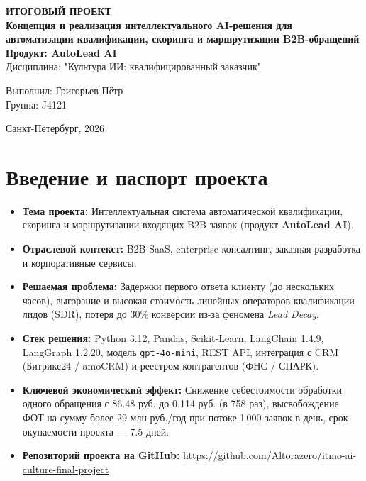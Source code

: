 \documentclass[12pt,a4paper]{article}
\begin{document}
	
	\begin{titlepage}
		\begin{center}
			\vspace*{3.5cm}
			\Huge \textbf{ИТОГОВЫЙ ПРОЕКТ} \\
			\vspace{0.4cm}
			\LARGE \textbf{Концепция и реализация интеллектуального AI-решения для автоматизации квалификации, скоринга и маршрутизации B2B-обращений} \\
			\vspace{0.3cm}
			\Large \textbf{Продукт: \guillemotleft AutoLead AI\guillemotright} \\
			\vspace{1cm}
			\Large Дисциплина: "Культура ИИ: квалифицированный заказчик" \\
			\vspace{2.5cm}
			\large
			\begin{flushright}
				Выполнил: Григорьев Пётр \\
				Группа: J4121 \\
			\end{flushright}
			\vfill
			Санкт-Петербург, 2026
		\end{center}
	\end{titlepage}

	\section*{Введение и паспорт проекта}
	
	\begin{itemize}[noitemsep,topsep=2pt]
		\item \textbf{Тема проекта:} Интеллектуальная система автоматической квалификации, скоринга и маршрутизации входящих B2B-заявок (продукт \textbf{\guillemotleft AutoLead AI\guillemotright}).
		\item \textbf{Отраслевой контекст:} B2B SaaS, enterprise-консалтинг, заказная разработка и корпоративные сервисы.
		\item \textbf{Решаемая проблема:} Задержки первого ответа клиенту (до нескольких часов), выгорание и высокая стоимость линейных операторов квалификации лидов (SDR), потеря до 30\% конверсии из-за феномена \textit{Lead Decay}.
		\item \textbf{Стек решения:} Python 3.12, Pandas, Scikit-Learn, LangChain 1.4.9, LangGraph 1.2.20, модель \texttt{gpt-4o-mini}, REST API, интеграция с CRM (Битрикс24 / amoCRM) и реестром контрагентов (ФНС / СПАРК).
		\item \textbf{Ключевой экономический эффект:} Снижение себестоимости обработки одного обращения с 86.48 руб. до 0.114 руб. (в 758 раз), высвобождение ФОТ на сумму более 29 млн руб./год при потоке 1\,000 заявок в день, срок окупаемости проекта --- 7.5 дней.
		\item \textbf{Репозиторий проекта на GitHub:} \url{https://github.com/Altorazero/itmo-ai-culture-final-project}
	\end{itemize}
\end{document}
